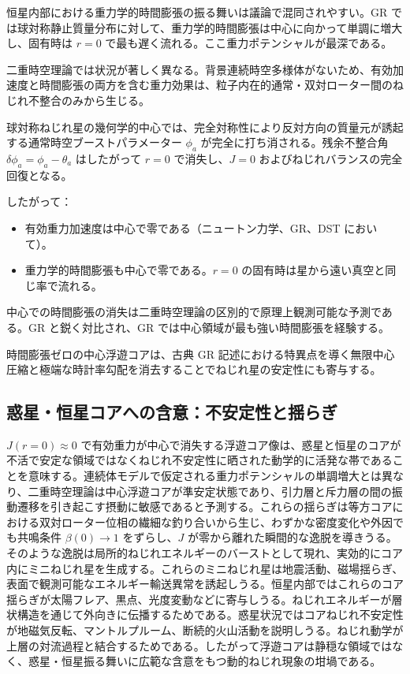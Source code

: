 \documentclass[dvipdfmx,a4paper]{article}
\begin{document}
恒星内部における重力学的時間膨張の振る舞いは議論で混同されやすい。GR では球対称静止質量分布に対して、重力学的時間膨張は中心に向かって単調に増大し、固有時は $r=0$ で最も遅く流れる。ここ重力ポテンシャルが最深である。

二重時空理論では状況が著しく異なる。背景連続時空多様体がないため、有効加速度と時間膨張の両方を含む重力効果は、粒子内在的通常・双対ローター間のねじれ不整合のみから生じる。

球対称ねじれ星の幾何学的中心では、完全対称性により反対方向の質量元が誘起する通常時空ブーストパラメーター $\phi_a$ が完全に打ち消される。残余不整合角 $\delta\phi_a = \phi_a - \theta_a$ はしたがって $r=0$ で消失し、$J=0$ およびねじれバランスの完全回復となる。

したがって：
\begin{itemize}
  \item 有効重力加速度は中心で零である（ニュートン力学、GR、DST において）。
  \item 重力学的時間膨張も中心で零である。$r=0$ の固有時は星から遠い真空と同じ率で流れる。
\end{itemize}

中心での時間膨張の消失は二重時空理論の区別的で原理上観測可能な予測である。GR と鋭く対比され、GR では中心領域が最も強い時間膨張を経験する。

時間膨張ゼロの中心浮遊コアは、古典 GR 記述における特異点を導く無限中心圧縮と極端な時計率勾配を消去することでねじれ星の安定性にも寄与する。

\subsection{惑星・恒星コアへの含意：不安定性と揺らぎ}

$J(r=0) \approx 0$ で有効重力が中心で消失する浮遊コア像は、惑星と恒星のコアが不活で安定な領域ではなくねじれ不安定性に晒された動学的に活発な帯であることを意味する。連続体モデルで仮定される重力ポテンシャルの単調増大とは異なり、二重時空理論は中心浮遊コアが準安定状態であり、引力層と斥力層の間の振動遷移を引き起こす摂動に敏感であると予測する。これらの揺らぎは等方コアにおける双対ローター位相の繊細な釣り合いから生じ、わずかな密度変化や外因でも共鳴条件 $\beta(0) \to 1$ をずらし、$J$ が零から離れた瞬間的な逸脱を導きうる。そのような逸脱は局所的ねじれエネルギーのバーストとして現れ、実効的にコア内にミニねじれ星を生成する。これらのミニねじれ星は地震活動、磁場揺らぎ、表面で観測可能なエネルギー輸送異常を誘起しうる。恒星内部ではこれらのコア揺らぎが太陽フレア、黒点、光度変動などに寄与しうる。ねじれエネルギーが層状構造を通じて外向きに伝播するためである。惑星状況ではコアねじれ不安定性が地磁気反転、マントルプルーム、断続的火山活動を説明しうる。ねじれ動学が上層の対流過程と結合するためである。したがって浮遊コアは静穏な領域ではなく、惑星・恒星振る舞いに広範な含意をもつ動的ねじれ現象の坩堝である。
\end{document}
